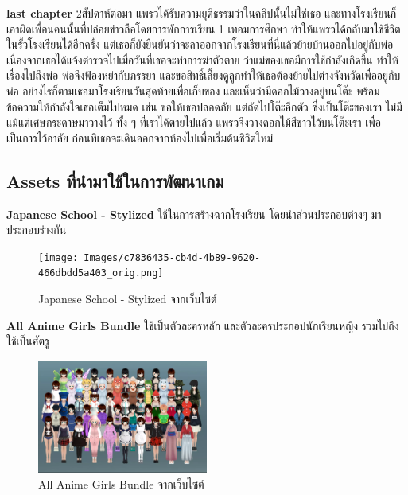 \textbf{last chapter}
2สัปดาห์ต่อมา แพรวได้รับความยุติธรรมว่าในคลิปนั้นไม่ใช่เธอ และทางโรงเรียนก็เอาผิดเพื่อนคนนั้นที่ปล่อยข่าวลือโดยการพักการเรียน 1 เทอมการศึกษา ทำให้แพรวได้กลับมาใช้ชีวิตในรั้วโรงเรียนได้อีกครั้ง แต่เธอก็ยังยืนยันว่าจะลาออกจากโรงเรียนที่นี่แล้วย้ายบ้านออกไปอยู่กับพ่อ เนื่องจากเธอได้แจ้งตำรวจไปเมื่อวันที่เธอจะทำการฆ่าตัวตาย ว่าแม่ของเธอมีการใช้กำลังเกิดขึ้น ทำให้เรื่องไปถึงพ่อ พ่อจึงฟ้องหย่ากับภรรยา และขอสิทธิ์เลี้ยงดูลูกทำให้เธอต้องย้ายไปต่างจังหวัดเพื่ออยู่กับพ่อ อย่างไรก็ตามเธอมาโรงเรียนวันสุดท้ายเพื่อเก็บของ และเห็นว่ามีดอกไม้วางอยู่บนโต๊ะ พร้อมข้อความให้กำลังใจเธอเต็มไปหมด เช่น ขอให้เธอปลอดภัย แต่ถัดไปโต๊ะอีกตัว ซึ่งเป็นโต๊ะของเรา ไม่มีแม้แต่เศษกระดาษมาวางไว้ ทั้ง ๆ ที่เราได้ตายไปแล้ว แพรวจึงวางดอกไม้สีขาวไว้บนโต๊ะเรา เพื่อเป็นการไว้อาลัย ก่อนที่เธอจะเดินออกจากห้องไปเพื่อเริ่มต้นชีวิตใหม่


\subsection{Assets ที่นำมาใช้ในการพัฒนาเกม}
\subsubitem \textbf{Japanese School - Stylized} \cite{japanese-school:asset} ใช้ในการสร้างฉากโรงเรียน โดยนำส่วนประกอบต่างๆ มาประกอบร่างกัน
\begin{figure}[h]
  \centering
  \texttt{[image: Images/c7836435-cb4d-4b89-9620-466dbdd5a403\_orig.png]}
  \caption{Japanese School - Stylized จากเว็บไซต์}\label{JapaneseSchool}
\end{figure}


\subsubitem \textbf{All Anime Girls Bundle} \cite{All-Anime-Girls-Bundle:asset} ใช้เป็นตัวละครหลัก และตัวละครประกอปนักเรียนหญิง รวมไปถึงใช้เป็นศัตรู
\begin{figure}[h]
  \centering
  \includegraphics[width=0.5\textwidth, height=0.15\textheight]{Images/All Anime Girls Bundle.png}
  \caption{All Anime Girls Bundle จากเว็บไซต์}\label{All Anime Girls Bundle}
\end{figure}


